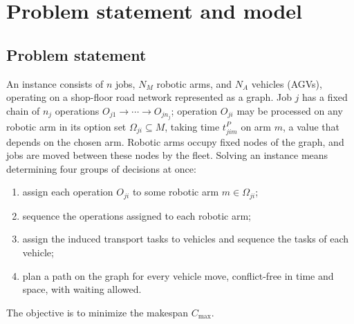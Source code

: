 \section{Problem statement and model}
\label{sec:Chapter_III}
\subsection{Problem statement}

An instance consists of $n$ jobs, $N_M$ robotic arms, and $N_A$ vehicles (AGVs), operating on a shop-floor road network represented as a graph.
Job $j$ has a fixed chain of $n_j$ operations $O_{j1}\to\cdots\to O_{jn_j}$; operation $O_{ji}$
may be processed on any robotic arm in its option set $\Omega_{ji}\subseteq M$, taking time
$t^P_{jim}$ on arm $m$, a value that depends on the chosen arm. Robotic arms occupy fixed nodes of the graph, and jobs are moved between these nodes by the fleet.
Solving an instance means determining four groups of decisions at once:

\begin{enumerate}[label=(\roman*),leftmargin=*,topsep=2pt,itemsep=1pt]
\item assign each operation $O_{ji}$ to some robotic arm $m\in\Omega_{ji}$;
\item sequence the operations assigned to each robotic arm;
\item assign the induced transport tasks to vehicles and sequence the tasks of each vehicle;
\item plan a path on the graph for every vehicle move, conflict-free in time and space, with waiting allowed.
\end{enumerate}

The objective is to minimize the makespan $C_{\max}$.

